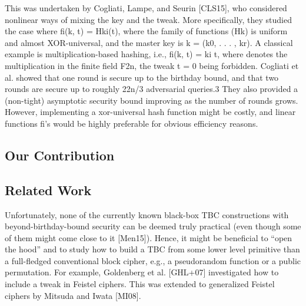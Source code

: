 This was undertaken by Cogliati, Lampe, and Seurin [CLS15], who considered nonlinear
ways of mixing the key and the tweak. More specifically, they studied the case where fi(k, t) =
Hki(t), where the family of functions (Hk) is uniform and almost XOR-universal, and the
master key is k = (k0, . . . , kr). A classical example is multiplication-based hashing, i.e.,
fi(k, t) = ki 
t, where 
denotes the multiplication in the finite field F2n, the tweak t = 0
being forbidden. Cogliati et al. showed that one round is secure up to the birthday bound,
and that two rounds are secure up to roughly 22n/3 adversarial queries.3 They also provided a
(non-tight) asymptotic security bound improving as the number of rounds grows. However,
implementing a xor-universal hash function might be costly, and linear functions fi’s would be
highly preferable for obvious efficiency reasons.






\subsection{Our Contribution}




\medskip{}



\medskip{}








\subsection{Related Work}


Unfortunately, none of the currently known black-box
TBC constructions with beyond-birthday-bound security can be deemed truly practical (even
though some of them might come close to it [Men15]). Hence, it might be beneficial to “open
the hood” and to study how to build a TBC from some lower level primitive than a full-fledged
conventional block cipher, e.g., a pseudorandom function or a public permutation. For example,
Goldenberg et al. [GHL+07] investigated how to include a tweak in Feistel ciphers. This was
extended to generalized Feistel ciphers by Mitsuda and Iwata [MI08].




